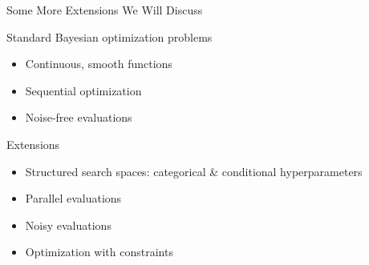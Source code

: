 
\begin{frame}{Some More Extensions We Will Discuss}
\begin{block}{Standard Bayesian optimization problems}
\begin{itemize}
    \item Continuous, smooth functions
    \item Sequential optimization
    \item Noise-free evaluations
\end{itemize}
\end{block}
\begin{block}{Extensions}
\begin{itemize}
    \item Structured search spaces: categorical \& conditional hyperparameters 
    \item Parallel evaluations
    \item Noisy evaluations
    \item Optimization with constraints
\end{itemize}
\end{block}    
\end{frame}

